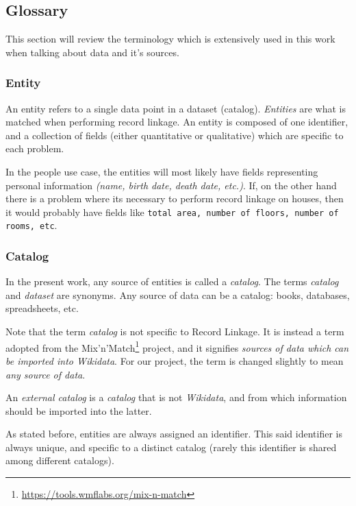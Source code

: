 \documentclass[epsfig,a4paper,11pt,titlepage,twoside,openany]{book}
\newcommand{\footurl}[1]{\footnote{\url{#1}}}
\begin{document}
\subsection{Glossary}
\label{sec:apx-glossary}

This section will review the terminology which is extensively used in this work when talking about data and it's sources.

\subsubsection{Entity}
\label{sec:rl-term-entity}

An entity refers to a single data point in a dataset (catalog). \textit{Entities} are what is matched when performing record linkage. An entity is composed of one identifier, and a collection of fields (either quantitative or qualitative) which are specific to each problem. 
  
In the people use case, the entities will most likely have fields representing personal information \textit{(name, birth date, death date, etc.)}. If, on the other hand there is a problem where its necessary to perform record linkage on houses, then it would probably have fields like \texttt{total area, number of floors, number of rooms, etc}.


\subsubsection{Catalog}
\label{sec:rl-term-catalog}

In the present work, any source of entities is called a \textit{catalog}. The terms \textit{catalog} and  \textit{dataset} are synonyms. Any source of data can be a catalog: books, databases, spreadsheets, etc. 

Note that the term \textit{catalog} is not specific to Record Linkage. It is instead a term adopted from the Mix'n'Match\footurl{https://tools.wmflabs.org/mix-n-match} project, and it signifies \textit{sources of data which can be imported into Wikidata}. For our project, the term is changed slightly to mean \textit{any source of data}. 

An \textit{external catalog} is a \textit{catalog} that is not \textit{Wikidata}, and from which information should be imported into the latter.

As stated before, entities are always assigned an identifier. This said identifier is always unique, and specific to a distinct catalog (rarely this identifier is shared among different catalogs). 
\end{document}

